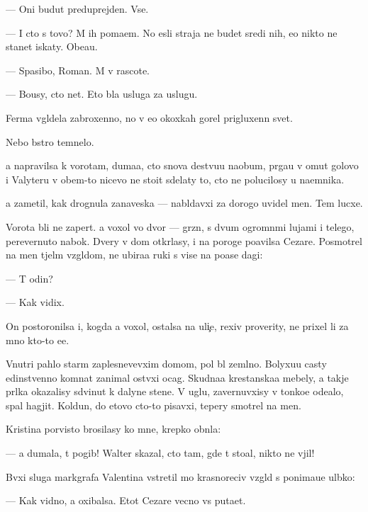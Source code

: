 \documentclass[10pt]{book}
\begin{document}
— Oni budut preduprejden{\yi}. Vse.

— I cto s tovo? M{\yi} ih po{\y}ma{\y}em. No {\y}esli straja ne budet sredi nih, {\y}e{\y}o nikto ne stanet iskaty. Obe{\x}a{\y}u.

— Spasibo, Roman. M{\yi} v rascote.

— Bo{\y}usy, cto net. Eto b{\yi}la usluga za uslugu.



Ferma v{\yi}gl{\ia}dela zabroxenno{\y}, no v {\y}e{\y}o okoxkah gorel prigluxenn{\yi}{\y} svet.

Nebo b{\yi}stro temnelo.

{\Y}a napravilsa k vorotam, duma{\y}a, cto snova de{\y}stvu{\y}u naobum, pr{\yi}ga{\y}u v omut golovo{\y} i Valyteru v ob{\x}em-to nicevo ne sto{\y}it sdelaty to, cto ne polucilosy u na{\y}emnika.

{\Y}a zametil, kak drognula zanaveska — nabl{\iu}davxi{\y} za dorogo{\y} uvidel men{\ia}. Tem lucxe.

Vorota b{\yi}li ne zapert{\yi}. {\Y}a  voxol vo dvor — gr{\ia}zn{\yi}{\y}, s dvum{\ia} ogromn{\yi}mi lujami i telego{\y}, perevernuto{\y} nabok. Dvery v dom otkr{\yi}lasy, i na poroge po{\y}avilsa Cezare. Posmotrel na men{\ia} t{\ia}jel{\yi}m vzgl{\ia}dom, ne ubira{\y}a ruki s vis{\ia}{\x}e{\y} na po{\y}ase dagi:

— T{\yi} odin?

— Kak vidix.

On postoronilsa i, kogda {\y}a  voxol, ostalsa na uli{\c}e, rexiv proverity, ne prixel li za mno{\y} kto-to {\y}e{\x}e.

Vnutri pahlo star{\yi}m zaplesnevevxim domom, pol b{\yi}l zeml{\ia}no{\y}. Bolyxu{\y}u casty {\y}edinstvenno{\y} komnat{\yi} zanimal ost{\yi}vxi{\y} ocag. Skudna{\y}a krest{\y}anska{\y}a mebely, a takje pr{\ia}lka okazalisy sdvinut{\yi} k dalyne{\y} stene. V uglu, zavernuvxisy v tonko{\y}e ode{\y}alo, spal hagjit. Koldun, do etovo cto-to pisavxi{\y}, tepery smotrel na men{\ia}.

Kristina por{\yi}visto brosilasy ko mne, krepko obn{\ia}la:

— {\Y}a dumala, t{\yi} pogib! Walter skazal, cto tam, gde t{\yi} sto{\y}al, nikto ne v{\yi}jil!

B{\yi}vxi{\y} sluga markgrafa Valentina vstretil mo{\y} krasnoreciv{\yi}{\y} vzgl{\ia}d s ponima{\y}u{\x}e{\y} ul{\yi}bko{\y}:

— Kak vidno, {\y}a oxibalsa. Etot Cezare vecno vs{\e} puta{\y}et.
\end{document}
